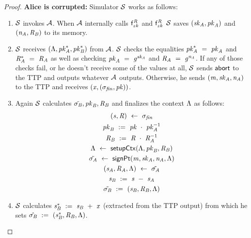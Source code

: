 \begin{proof}
    \textbf{Alice is corrupted: } Simulator $\mathcal{S}$ works as follows:
    \begin{enumerate}
        \item $\mathcal{S}$ invokes $\mathcal{A}$.
        When $\mathcal{A}$ internally calls $\mathsf{f}^{\mathit{R}}_{zk}$ and $\mathsf{f}^{\mathit{R}}_{zk}$ $\mathcal{S}$ saves $(\mathit{sk}_{\mathit{A}}, \mathit{pk}_{\mathit{A}})$ and $(\mathit{\mathit{n}_{\mathit{A}}}, \mathit{R}_{\mathit{B}})$ to its memory.
        \item $\mathcal{S}$ receives $(\Lambda, \mathit{pk}_{\mathit{A}}^*, \mathit{pk}_{\mathit{B}}^*)$ from $\mathcal{A}$.
        $\mathcal{S}$ checks the equalities $\mathit{pk}_{\mathit{A}}^* ~=~ \mathit{pk}_{\mathit{A}}$ and $\mathit{R}_{\mathit{A}}^* ~=~ \mathit{R}_{\mathit{A}}$ as well as checking $\mathit{pk}_{\mathit{A}} ~=~ \mathit{g}^{\mathit{sk}_{\mathit{A}}}$ and $\mathit{R}_{\mathit{A}} ~=~ \mathit{g}^{\mathit{\mathit{n}_{\mathit{A}}}}$.
        If any of those checks fail, or he doesn't receive some of the values at all, $\mathcal{S}$ sends $\mathsf{abort}$ to the TTP and outputs whatever $\mathcal{A}$ outputs.
        Otherwise, he sends $(\mathit{m}, \mathit{sk}_{\mathit{A}}, \mathit{\mathit{n}_{\mathit{A}}})$ to the TTP and receives $(\mathit{x}, (\sigma_{\mathit{fin}}, \mathit{pk}))$.
        \item Again $\mathcal{S}$ calculates $\tilde{\sigma_{\mathit{B}}}, \mathit{pk}_{\mathit{B}}, \mathit{R}_{\mathit{B}}$ and finalizes the context $\Lambda$ as follows:
        \begin{gather*}
            (\mathit{s}, \mathit{R}) ~\leftarrow~ \sigma_{\mathit{fin}} \\
            \mathit{pk}_{\mathit{B}} ~:=~ \mathit{pk} ~\cdot~ \mathit{pk}_{\mathit{A}}^{-1} \\
            \mathit{R}_{\mathit{B}} ~:=~ \mathit{R} ~\cdot~ \mathit{R}_{\mathit{A}}^{-1} \\
            \Lambda ~\leftarrow~ \mathsf{setupCtx}( \Lambda, \mathit{pk}_{\mathit{B}}, \mathit{R}_{\mathit{B}} ) \\
            \tilde{\sigma_{\mathit{A}}} ~\leftarrow~ \mathsf{signPt}(\mathit{m}, \mathit{sk}_{\mathit{A}}, \mathit{\mathit{n}_{\mathit{A}}}, \Lambda) \\
            (\mathit{s}_{\mathit{A}}, \mathit{R}_{\mathit{A}}, \Lambda) ~\leftarrow~ \tilde{\sigma_{\mathit{A}}} \\
            \mathit{s}_{\mathit{B}} ~:=~ \mathit{s} ~-~ \mathit{s}_{\mathit{A}} \\
            \tilde{\sigma_{\mathit{B}}} ~:=~ (\mathit{s}_{\mathit{B}}, \mathit{R}_{\mathit{B}}, \Lambda)
        \end{gather*}
        \item $\mathcal{S}$ calculates $\mathit{s}_{\mathit{B}}^* ~:=~ \mathit{s}_{\mathit{B}} ~+~ \mathit{x}$ (extracted from the TTP output) from which he sets $\hat{\sigma_{\mathit{B}}} ~:=~ (\mathit{s}_{\mathit{B}}^*, \mathit{R}_{\mathit{B}}, \Lambda)$.

\end{enumerate}
\end{proof}
